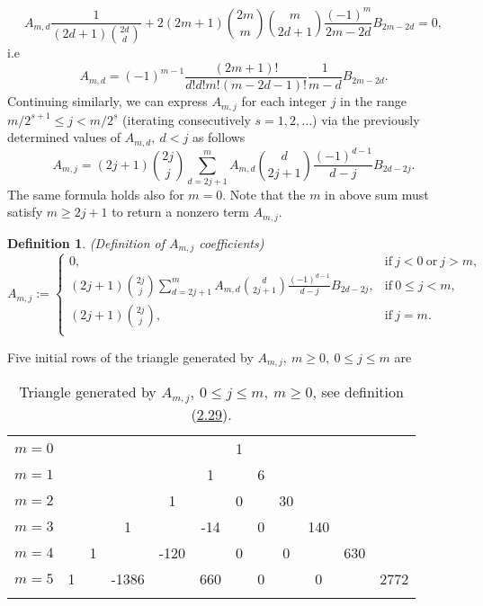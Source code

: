 \documentclass[11pt, letterpaper]{amsart} da da ya qq
\theoremstyle{definition}
\newtheorem{defn}[thm]{Definition}
\theoremstyle{remark}
\numberwithin{equation}{section}
\begin{document}
\begin{equation*}\label{gen_10}
A_{m,d} \frac{1}{(2d+1)\binom{2d}{d}} + 2 (2m+1) \binom{2m}{m} \binom{m}{2d+1} \frac{(-1)^m}{2m-2d} B_{2m-2d} = 0,
\end{equation*}
i.e
\begin{equation*}\label{gen_11}
A_{m,d} = (-1)^{m-1} \frac{(2m+1)!}{d!d!m!(m-2d-1)!}\frac{1}{m-d} B_{2m-2d}.
\end{equation*}
Continuing similarly, we can express $A_{m,j}$ for each integer $j$ in the range $m/2^{s+1}\leq j< m/2^s$ (iterating consecutively $s=1,2,...$) via the previously determined values of $A_{m,d}, \ d<j$ as follows
\begin{equation*}\label{gen_12}
A_{m,j} = (2j+1)\binom{2j}{j} \sum_{d=2j+1}^{m} A_{m,d} \binom{d}{2j+1} \frac{(-1)^{d-1}}{d-j} B_{2d-2j}.
\end{equation*}
The same formula holds also for $m=0$. Note that the $m$ in above sum must satisfy $m\geq2j+1$ to return a nonzero term $A_{m,j}$.
\begin{defn}\label{gen_13}
\textit{(Definition of $A_{m,j}$ coefficients)}
\begin{equation*}
A_{m,j}:=
\begin{cases}
0, & \mathrm{if } \ j<0 \ \mathrm{or } \ j>m, \\
(2j+1)\binom{2j}{j} \sum_{d=2j+1}^{m} A_{m,d} \binom{d}{2j+1} \frac{(-1)^{d-1}}{d-j} B_{2d-2j}, & \mathrm{if } \ 0 \leq j < m, \\
(2j+1)\binom{2j}{j}, & \mathrm{if } \ j=m. \\
\end{cases}
\end{equation*}
\end{defn}
Five initial rows of the triangle generated by $A_{m,j}, \ m\geq0, \ 0\leq j \leq m$ are

\begin{table}[H]
\begin{tabular}{rccccccccccc}
$m=0$&  &    &    &    &    &  1 &    &    &    &    &   \\\noalign{\smallskip\smallskip}
$m=1$&  &    &    &    &  1 &    &  6 &    &    &    &   \\\noalign{\smallskip\smallskip}
$m=2$&  &    &    &  1 &    &  0 &    &  30 &    &    &   \\\noalign{\smallskip\smallskip}
$m=3$&  &    &  1 &    &  -14 &    &  0 &    &  140 &    &   \\\noalign{\smallskip\smallskip}
$m=4$&  &  1 &    &  -120 &    &  0 &    &  0 &    &  630 &   \\\noalign{\smallskip\smallskip}
$m=5$&1 &    &  -1386 &    & 660 &    & 0 &    &  0 &    & 2772 \\\noalign{\smallskip\smallskip}
\end{tabular}
\caption{Triangle generated by $A_{m,j}, \ 0\leq j \leq m, \ m\geq0$, see definition (\hyperref[gen_13]{2.29}).} \label{fig_4}
\end{table}
\end{document}
